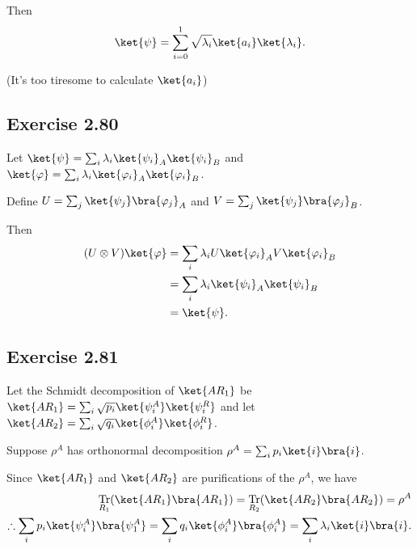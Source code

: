 \documentclass[a4paper,12pt]{article}
\DeclareMathOperator{\Tr}{Tr}
\begin{document}
Then
\begin{align*}
	\ket{\psi} = \sum_{i=0}^1 \sqrt{\lambda_i} \ket{a_i} \ket{\lambda_i}.
\end{align*}


(It's too tiresome to calculate $\ket{a_i}$)



\subsection*{Exercise 2.80}
Let $\ket{\psi} = \sum_i \lambda_i \ket{\psi_i}_A \ket{\psi_i}_B$ and $\ket{\varphi} = \sum_i \lambda_i \ket{\varphi_i}_A \ket{\varphi_i}_B$.

Define $U = \sum_j \ket{\psi_j}\bra{\varphi_j}_A$ and $V = \sum_j \ket{\psi_j}\bra{\varphi_j}_B$.

Then
\begin{align*}
	(U \otimes V) \ket{\varphi} &= \sum_i \lambda_i U \ket{\varphi_i}_A  V \ket{\varphi_i}_B\\
		&= \sum_i \lambda_i \ket{\psi_i}_A \ket{\psi_i}_B\\
		&= \ket{\psi}.
\end{align*}


\subsection*{Exercise 2.81}
Let the Schmidt decomposition of $\ket{AR_1}$ be $\ket{AR_1} = \sum_i \sqrt{p_i} \ket{\psi_i^A} \ket{\psi_i^R}$ and
let $\ket{AR_2} = \sum_i \sqrt{q_i} \ket{\phi_i^A} \ket{\phi_i^R}$.

Suppose $\rho^A$ has orthonormal decomposition $\rho^A = \sum_i p_i \ket{i}\bra{i}$.

Since $\ket{AR_1}$ and $\ket{AR_2}$ are purifications of the $\rho^A$, we have
%
\begin{align*}
    \Tr_{R_1} (\ket{AR_1}\bra{AR_1}) = \Tr_{R_2} (\ket{AR_2}\bra{AR_2}) = \rho^A\\
    \therefore \sum_i p_i \ket{\psi_i^A}\bra{\psi_1^A} = \sum_i q_i \ket{\phi_i^A}\bra{\phi_i^A} = \sum_i \lambda_i \ket{i}\bra{i}.
\end{align*}
\end{document}
